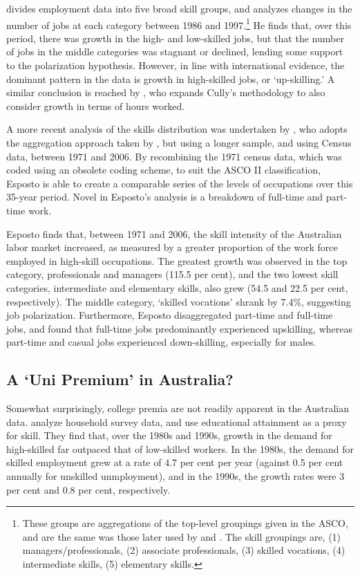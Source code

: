 \citet{Cully1999} divides employment data into five broad skill groups, and analyzes changes in the number of jobs at each category between 1986 and 1997.\footnote{These groups are aggregations of the top-level groupings given in the ASCO, and are the same was those later used by \citet{Wooden2000} and \citet{Esposto2012}. The skill groupings are, (1) managers/professionals, (2) associate professionals, (3) skilled vocations, (4) intermediate skills, (5) elementary skills.} He finds that, over this period, there was growth in the high- and low-skilled jobs, but that the number of jobs in the middle categories was stagnant or declined, lending some support to the polarization hypothesis. However, in line with international evidence, the dominant pattern in the data is growth in high-skilled jobs, or `up-skilling.' A similar conclusion is reached by \cite{Wooden2000}, who expands Cully's methodology to also consider growth in terms of hours worked.

A more recent analysis of the skills distribution was undertaken by \citet{Esposto2012}, who adopts the aggregation approach taken by \citet{Cully1999}, but using a longer sample, and using Census data, between 1971 and 2006. By recombining the 1971 census data, which was coded using an obsolete coding scheme, to suit the ASCO II classification, Esposto is able to create a comparable series of the levels of occupations over this 35-year period. Novel in Esposto's analysis is a breakdown of full-time and part-time work.

Esposto finds that, between 1971 and 2006, the skill intensity of the Australian labor market increased, as measured by a greater proportion of the work force employed in high-skill occupations. The greatest growth was observed in the top category, professionals and managers (115.5 per cent), and the two lowest skill categories, intermediate and elementary skills, also grew (54.5 and 22.5 per cent, respectively). The middle category, `skilled vocations' shrank by 7.4\%, suggesting job polarization. Furthermore, Esposto disaggregated part-time and full-time jobs, and found that full-time jobs predominantly experienced upskilling, whereas part-time and casual jobs experienced down-skilling, especially for males.

\subsection{A `Uni Premium' in Australia?}

Somewhat surprisingly, college premia are not readily apparent in the Australian data. \citet{Barnes2002} analyze household survey data, and use educational attainment as a proxy for skill. They find that, over the 1980s and 1990s, growth in the demand for high-skilled far outpaced that of low-skilled workers. In the 1980s, the demand for skilled employment grew at a rate of 4.7 per cent per year (against 0.5 per cent annually for unskilled unmployment), and in the 1990s, the growth rates were 3 per cent and 0.8 per cent, respectively.

